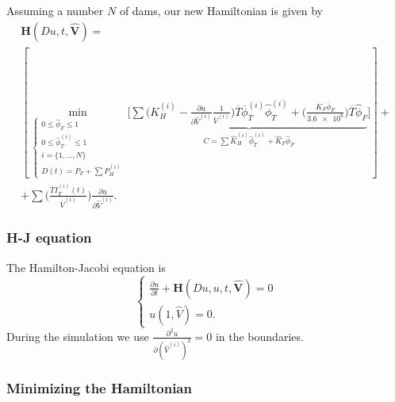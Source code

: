 \documentclass[12pt]{article}
\theoremstyle{definition}
\theoremstyle{remark}
\begin{document}
Assuming a number $N$ of dams, our new Hamiltonian is given by
\begin{multline*}
\mathbf{H}(Du,t,\bm{\hat{V}})=\\
\left[\min_{\begin{cases}
0\leq\hat{\phi}_F\leq1\\
0\leq\hat{\phi}_T^{(i)}\leq1\\
i=\{1,\dots,N\}\\
D(t)=P_F+\sum P_H^{(i)}
\end{cases}}\Bigg[\underbrace{\sum\Bigg(K_H^{(i)}-\frac{\partial u}{\partial \hat{V}^{(i)}}\frac{1}{\overline{V}^{(i)}}\Bigg)\overline{T}\overline{\phi}_T^{(i)}\hat{\phi}_T^{(i)}+\Bigg(\frac{K_F\overline{\phi}_F}{\num{3.6e6}}\Bigg)\overline{T}\hat{\phi}_F}_{C=\sum\hat{K}_H^{(i)}\hat{\phi}_T^{(i)}+\hat{K}_F\hat{\phi}_F}\Bigg]\right]+\\+\sum\Bigg(\frac{\overline{T}I_T^{(i)}(t)}{\overline{V}^{(i)}}\Bigg)\frac{\partial u}{\partial \hat{V}^{(i)}}.
\end{multline*}

\subsubsection{H-J equation}

The Hamilton-Jacobi equation is
\begin{equation*}
\begin{cases}
\frac{\partial u}{\partial t}+\mathbf{H}(Du,u,t,\bm{\hat{V}})=0\\
u(1,\hat{V})=0.
\end{cases}
\end{equation*}
During the simulation we use $\frac{\partial^2u}{\partial(\hat{V}^{(i)})^2}=0$ in the boundaries.

\subsubsection{Minimizing the Hamiltonian}
\end{document}
